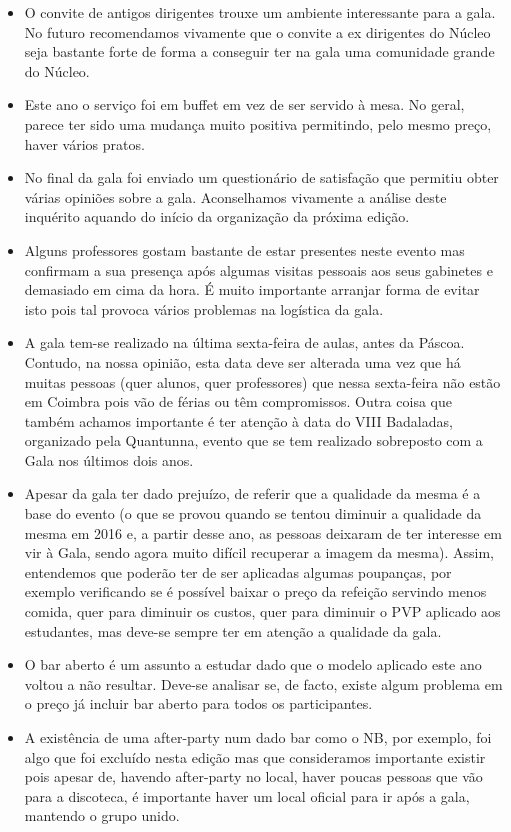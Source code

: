 \begin{itemize}
\item O convite de antigos dirigentes trouxe um ambiente interessante para a gala. No futuro recomendamos vivamente que o convite a ex dirigentes do Núcleo seja bastante forte de forma a conseguir ter na gala uma comunidade grande do Núcleo.
\item Este ano o serviço foi em buffet em vez de ser servido à mesa. No geral, parece ter sido uma mudança muito positiva permitindo, pelo mesmo preço, haver vários pratos.
\item No final da gala foi enviado um questionário de satisfação que permitiu obter várias opiniões sobre a gala. Aconselhamos vivamente a análise deste inquérito aquando do início da organização da próxima edição.
\item Alguns professores gostam bastante de estar presentes neste evento mas confirmam a sua presença após algumas visitas pessoais aos seus gabinetes e demasiado em cima da hora. É muito importante arranjar forma de evitar isto pois tal provoca vários problemas na logística da gala.
\item A gala tem-se realizado na última sexta-feira de aulas, antes da Páscoa. Contudo, na nossa opinião, esta data deve ser alterada uma vez que há muitas pessoas (quer alunos, quer professores) que nessa sexta-feira não estão em Coimbra pois vão de férias ou têm compromissos. Outra coisa que também achamos importante é ter atenção à data do VIII Badaladas, organizado pela Quantunna, evento que se tem realizado sobreposto com a Gala nos últimos dois anos.
\item Apesar da gala ter dado prejuízo, de referir que a qualidade da mesma é a base do evento (o que se provou quando se tentou diminuir a qualidade da mesma em 2016 e, a partir desse ano, as pessoas deixaram de ter interesse em vir à Gala, sendo agora muito difícil recuperar a imagem da mesma). Assim, entendemos que poderão ter de ser aplicadas algumas poupanças, por exemplo verificando se é possível baixar o preço da refeição servindo menos comida, quer para diminuir os custos, quer para diminuir o PVP aplicado aos estudantes, mas deve-se sempre ter em atenção a qualidade da gala.
\item O bar aberto é um assunto a estudar dado que o modelo aplicado este ano voltou a não resultar. Deve-se analisar se, de facto, existe algum problema em o preço já incluir bar aberto para todos os participantes.
\item A existência de uma after-party num dado bar como o NB, por exemplo, foi algo que foi excluído nesta edição mas que consideramos importante existir pois apesar de, havendo after-party no local, haver poucas pessoas que vão para a discoteca, é importante haver um local oficial para ir após a gala, mantendo o grupo unido.
\end{itemize}